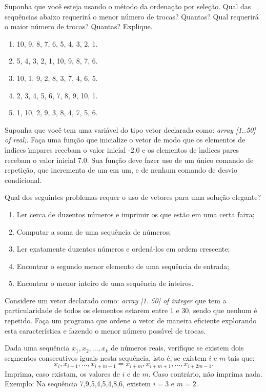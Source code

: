 \item Suponha que voc\^e esteja usando o m\'etodo da ordenação 
por sele\c c\~ao. Qual das sequências abaixo requerir\'a o menor n\'umero
de trocas? Quantas? Qual requerir\'a o maior n\'umero de trocas? Quantas?
Explique.
\begin {enumerate}
\item 10, 9, 8, 7, 6, 5, 4, 3, 2, 1.
\item 5, 4, 3, 2, 1, 10, 9, 8, 7, 6.
\item 10, 1, 9, 2, 8, 3, 7, 4, 6, 5.
\item 2, 3, 4, 5, 6, 7, 8, 9, 10, 1.
\item 1, 10, 2, 9, 3, 8, 4, 7, 5, 6.
\end {enumerate}

\item Suponha que voc\^e tem uma vari\'avel do tipo vetor declarada como:
\emph{array [1..50] of real;}. 
Fa\c ca uma fun\c c\~ao 
que inicialize o vetor de modo que os elementos
de \'{\i}ndices \'{\i}mpares recebam o valor inicial -2.0 e os elementos
de \'{\i}ndices pares recebam o valor inicial 7.0. Sua função deve
fazer uso de um único comando de repetição, que incrementa de um em um, e de 
nenhum comando de desvio condicional.

\item Qual dos seguintes problemas requer o uso de vetores para uma solu\c c\~ao elegante?
\begin {enumerate}
\item Ler cerca de duzentos n\'umeros e imprimir os que est\~ao em uma certa faixa;
\item Computar a soma de uma sequ\^encia de n\'umeros;
\item Ler exatamente duzentos n\'umeros e orden\'a-los em ordem crescente;
\item Encontrar o segundo menor elemento de uma sequ\^encia de entrada;
\item Encontrar o menor inteiro de uma sequ\^encia de inteiros.
\end {enumerate}

\item Considere um vetor  declarado como: 
\emph{array [1..50] of integer} que tem a 
particularidade de todos os elementos estarem entre 1 e 30, sendo que
nenhum \'e repetido. Fa\c ca um programa
que ordene o vetor de maneira eficiente explorando esta característica e fazendo
o menor n\'umero poss\'{\i}vel de trocas.

\item   Dada uma sequência $x_1, x_2, \ldots, x_k$ de números
  reais, verifique  se existem dois segmentos  consecutivos iguais nesta
  sequência, isto é, se existem $i$ e $m$ tais que:
\[ x_i, x_{i+1}, \ldots, x_{i+m-1}=x_{i+m}, x_{i+m+1}, \ldots, x_{i+2m-1}.
\]
Imprima, caso existam,  os valores de $i$ e de  $m$. Caso contrário, não
imprima  nada. Exemplo:  Na sequência  7,9,5,4,5,4,8,6, existem  $i=3$ e
$m=2$. 

